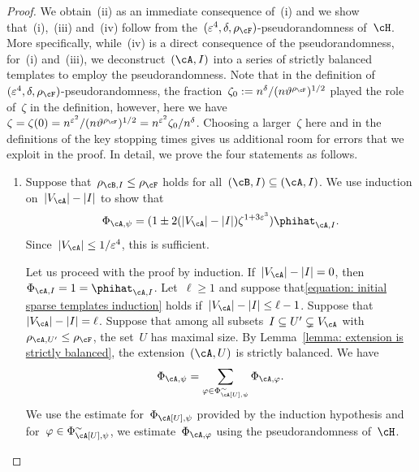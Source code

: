 \documentclass[11pt]{amsart}
\newcommand{\eps}{\varepsilon}
\DeclarePairedDelimiter{\abs}{\lvert}{\rvert}
\renewcommand{\theta}{\vartheta}
\def\phi{\varphi}
\theoremstyle{definition}
\numberwithin{equation}{section}
\begin{document}
	\begin{proof}
		We obtain~(ii) as an immediate consequence of~(i) and we show that~(i),~(iii) and~(iv) follow from the~$(\eps^4,\delta,\rho_\cF)$-pseudorandomness of~$\cH$.
		More specifically, while~(iv) is a direct consequence of the pseudorandomness, for~(i) and~(iii), we deconstruct~$(\cA,I)$ into a series of strictly balanced templates to employ the pseudorandomness.
		Note that in the definition of~$(\eps^4,\delta,\rho_\cF)$-pseudorandomness, the fraction~$\zeta_0:=n^\delta/(n\theta^{\rho_\cF})^{1/2}$ played the role of~$\zeta$ in the definition, however, here we have~$\zeta=\zeta(0)=n^{\eps^2}/(n\theta^{\rho_\cF})^{1/2}=n^{\eps^2}\zeta_0/n^\delta$.
		Choosing a larger~$\zeta$ here and in the definitions of the key stopping times gives us additional room for errors that we exploit in the proof.
		In detail, we prove the four statements as follows.

		\begin{enumerate}[label=\textup{(\roman*)}, topsep=0pt, wide]
			\item Suppose that~$\rho_{\cB,I}\leq\rho_\cF$ holds for all~$(\cB,I)\subseteq (\cA,I)$.
			We use induction on~$\abs{V_\cA}-\abs{I}$ to show that
			\begin{equation}\label{equation: initial sparse templates induction}
				\Phi_{\cA,\psi}=(1\pm 2(\abs{V_\cA}-\abs{I})\zeta^{1+3\eps^3})\phihat_{\cA,I}.
			\end{equation}
			Since~$\abs{V_\cA}\leq 1/\eps^4$, this is sufficient.
			
			Let us proceed with the proof by induction.
			If~$\abs{V_\cA}-\abs{I}=0$, then~$\Phi_{\cA,I}=1=\phihat_{\cA,I}$.
			Let~$\ell\geq 1$ and suppose that\eqref{equation: initial sparse templates induction} holds if~$\abs{V_\cA}-\abs{I}\leq \ell-1$.
			Suppose that~$\abs{V_\cA}-\abs{I}=\ell$.
			Suppose that among all subsets~$I\subseteq U'\subsetneq V_\cA$ with~$\rho_{\cA,U'}\leq \rho_\cF$, the set~$U$ has maximal size.
			By Lemma~\ref{lemma: extension is strictly balanced}, the extension~$(\cA,U)$ is strictly balanced.
			We have
			\begin{equation}\label{equation: initial sparse templates split}
				\Phi_{\cA,\psi}=\sum_{\phi\in\Phi_{\cA[U],\psi}^\sim} \Phi_{\cA,\phi}.
			\end{equation}
			We use the estimate for~$\Phi_{\cA[U],\psi}$ provided by the induction hypothesis and for~$\phi\in\Phi_{\cA[U],\psi}^\sim$, we estimate~$\Phi_{\cA,\phi}$ using the pseudorandomness of~$\cH$.
			

\end{enumerate}
\end{proof}
\end{document}
